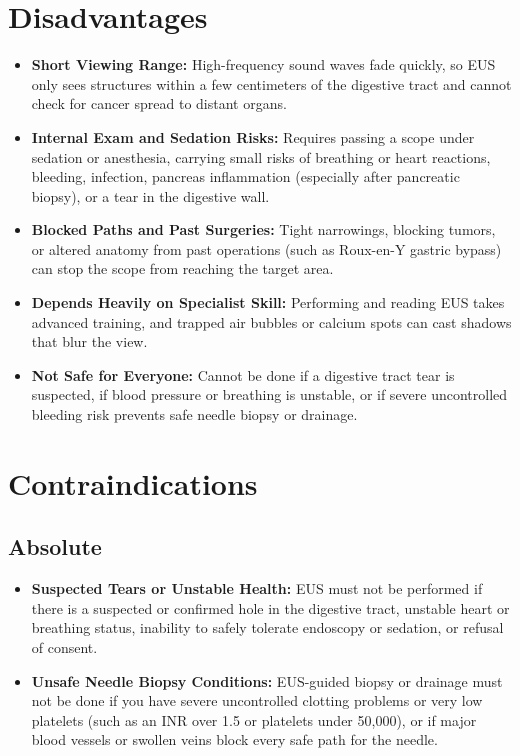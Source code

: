 \section{Disadvantages}

\begin{itemize}
    \item \textbf{Short Viewing Range:} High-frequency sound waves fade quickly, so EUS only sees structures within a few centimeters of the digestive tract and cannot check for cancer spread to distant organs.
    \item \textbf{Internal Exam and Sedation Risks:} Requires passing a scope under sedation or anesthesia, carrying small risks of breathing or heart reactions, bleeding, infection, pancreas inflammation (especially after pancreatic biopsy), or a tear in the digestive wall.
    \item \textbf{Blocked Paths and Past Surgeries:} Tight narrowings, blocking tumors, or altered anatomy from past operations (such as Roux-en-Y gastric bypass) can stop the scope from reaching the target area.
    \item \textbf{Depends Heavily on Specialist Skill:} Performing and reading EUS takes advanced training, and trapped air bubbles or calcium spots can cast shadows that blur the view.
    \item \textbf{Not Safe for Everyone:} Cannot be done if a digestive tract tear is suspected, if blood pressure or breathing is unstable, or if severe uncontrolled bleeding risk prevents safe needle biopsy or drainage.
\end{itemize}

\section{Contraindications}

\subsection{Absolute}

\begin{itemize}
    \item \textbf{Suspected Tears or Unstable Health:} EUS must not be performed if there is a suspected or confirmed hole in the digestive tract, unstable heart or breathing status, inability to safely tolerate endoscopy or sedation, or refusal of consent.
    \item \textbf{Unsafe Needle Biopsy Conditions:} EUS-guided biopsy or drainage must not be done if you have severe uncontrolled clotting problems or very low platelets (such as an INR over 1.5 or platelets under 50,000), or if major blood vessels or swollen veins block every safe path for the needle.
\end{itemize}

